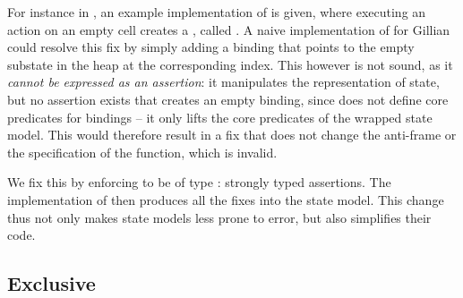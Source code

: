 For instance in \cite{sacha-phd}, an example implementation of \PMap{} is given, where executing an action on an empty cell creates a \Miss{}, called . A naive implementation of \PMap{} for Gillian could resolve this fix by simply adding a binding that points to the empty substate in the heap at the corresponding index. This however is not sound, as it \emph{cannot be expressed as an assertion}: it manipulates the representation of state, but no assertion exists that creates an empty binding, since \PMap{} does not define core predicates for bindings -- it only lifts the core predicates of the wrapped state model. This would therefore result in a fix that does not change the anti-frame or the specification of the function, which is invalid.

We fix this by enforcing  to be of type : strongly typed assertions. The implementation of  then produces all the fixes into the state model. This change thus not only makes state models less prone to error, but also simplifies their code.

\subsection{Exclusive} \label{subsec:ex-impl}

